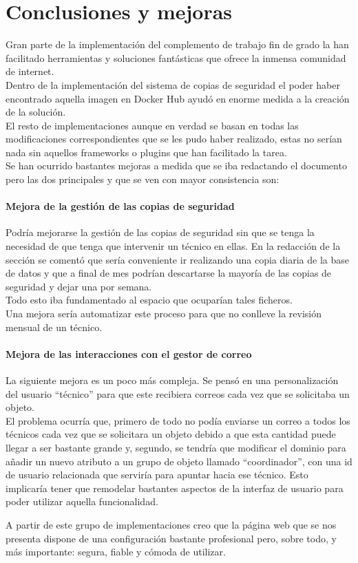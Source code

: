 \chapter{Conclusiones y mejoras}
Gran parte de la implementación del complemento de trabajo fin de grado la han facilitado herramientas y soluciones fantásticas que ofrece la inmensa comunidad de internet.
\\Dentro de la implementación del sistema de copias de seguridad el poder haber encontrado aquella imagen en Docker Hub ayudó en enorme medida a la creación de la solución.
\\El resto de implementaciones aunque en verdad se basan en todas las modificaciones correspondientes que se les pudo haber realizado, estas no serían nada sin aquellos frameworks o plugins que han facilitado la tarea.
\\Se han ocurrido bastantes mejoras a medida que se iba redactando el documento pero las dos principales y que se ven con mayor consistencia son:

\subsubsection{Mejora de la gestión de las copias de seguridad}
Podría mejorarse la gestión de las copias de seguridad sin que se tenga la necesidad de que tenga que intervenir un técnico en ellas. En la redacción de la sección se comentó que sería conveniente ir realizando una copia diaria de la base de datos y que a final de mes podrían descartarse la mayoría de las copias de seguridad y dejar una por semana.
\\Todo esto iba fundamentado al espacio que ocuparían tales ficheros.
\\Una mejora sería automatizar este proceso para que no conlleve la revisión mensual de un técnico.

\subsubsection{Mejora de las interacciones con el gestor de correo}
La siguiente mejora es un poco más compleja. Se pensó en una personalización del usuario ``técnico'' para que este recibiera correos cada vez que se solicitaba un objeto.
\\El problema ocurría que, primero de todo no podía enviarse un correo a todos los técnicos cada vez que se solicitara un objeto debido a que esta cantidad puede llegar a ser bastante grande y, segundo, se tendría que modificar el dominio para añadir un nuevo atributo a un grupo de objeto llamado ``coordinador'', con una id de usuario relacionada que serviría para apuntar hacia ese técnico. Esto implicaría tener que remodelar bastantes aspectos de la interfaz de usuario para poder utilizar aquella funcionalidad.

\vspace{\baselineskip}
A partir de este grupo de implementaciones creo que la página web que se nos presenta dispone de una configuración bastante profesional pero, sobre todo, y más importante: segura, fiable y cómoda de utilizar.